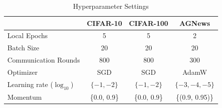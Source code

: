 \documentclass{article}
\theoremstyle{plain}
\theoremstyle{definition}
\theoremstyle{remark}
\begin{document}
\newpage
\begin{table}[!t]
    \centering
    \renewcommand{\arraystretch}{1.1}
    \caption{Hyperparameter Settings}
    \begin{tabular}{lccc}
    \hline
         & CIFAR-10 & CIFAR-100 & AGNews \\\hline
        Local Epochs & 5 & 5 & 2 \\
        Batch Size & 20 & 20 & 20 \\
        Communication Rounds & 800 & 800 & 300 \\
        Optimizer & SGD & SGD & AdamW \\
        Learning rate ($\log_{10}$) & $\{-1, -2\}$ & $\{-1, -2\}$ & $\{-3, -4, -5\}$ \\
        Momentum & \{0.0, 0.9\} & \{0.0, 0.9\} & \{(0.9, 0.95)\}  \\\hline
    \end{tabular}

    \label{tab:hyperparameter}
\end{table}
\end{document}
